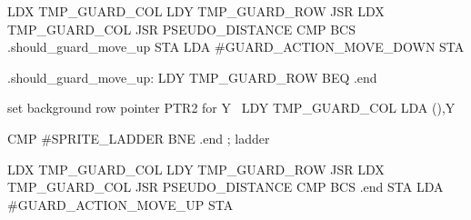 \documentclass[10pt]{report}%
\begin{document}
    LDX     TMP_GUARD_COL
    LDY     TMP_GUARD_ROW
    JSR     
    LDX     TMP_GUARD_COL
    JSR     PSEUDO_DISTANCE
    CMP     
    BCS     .should_guard_move_up
    STA     
    LDA     #GUARD_ACTION_MOVE_DOWN
    STA     

.should_guard_move_up:
    LDY     TMP_GUARD_ROW
    BEQ     .end

    \LA{}set background row pointer \code{}PTR2\edoc{} for \code{}Y\edoc{}~{\nwtagstyle{}}\RA{}
    LDY     TMP_GUARD_COL
    LDA     (),Y

    CMP     #SPRITE_LADDER
    BNE     .end
    ; ladder

    LDX     TMP_GUARD_COL
    LDY     TMP_GUARD_ROW
    JSR     
    LDX     TMP_GUARD_COL
    JSR     PSEUDO_DISTANCE
    CMP     
    BCS     .end
    STA     
    LDA     #GUARD_ACTION_MOVE_UP
    STA     
\end{document}
